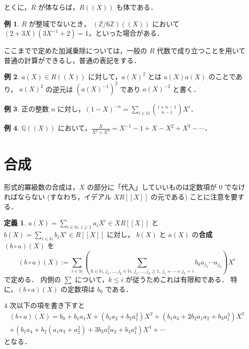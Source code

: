 \documentclass{jsarticle}
\newcommand{\N}{\mathbb{N}}
\newcommand{\Q}{\mathbb{Q}}
\newcommand{\Z}{\mathbb{Z}}
\theoremstyle{definition}
\newtheorem*{Dfn}{定義}
\newtheorem*{Exm}{例}
\newenvironment{dfn}{\vspace{1ex}\begin{screen}\begin{Dfn}}{\end{Dfn}\end{screen}\vspace{1ex}}
\newenvironment{exm}{\begin{leftbar}\begin{Exm}}{\end{Exm}\end{leftbar}}
\begin{document}
とくに，$R$ が体ならば，$R((X))$ も体である．

\begin{exm}
  $R$ が整域でないとき，
  $(\Z/6\Z)((X))$ において $(2 + 3X) (3X^{-1} + 2) = 1$，といった場合がある．
\end{exm}

ここまでで定めた加減乗除については，一般の $R$ 代数で成り立つことを用いて普通の計算ができるし，普通の表記をする．

\begin{exm}
  $a(X) \in R((X))$ に対して，$a(X)^2$ とは $a(X) a(X)$ のことであり，
  $a(X)^2$ の逆元は $(a(X)^{-1})^2$ であり $a(X)^{-2}$ と書く．
\end{exm}

\begin{exm}
  正の整数 $n$ に対し，$(1 - X)^{-n} = \sum_{i\in\N} \binom{i+n-1}{n-1} X^i$．
\end{exm}

\begin{exm}
  $\Q((X))$ において，$\frac{X}{X^2 + X^3} = X^{-1} - 1 + X - X^2 + X^3 - \cdots$．
\end{exm}


\section{合成}
形式的冪級数の合成は，$X$ の部分に「代入」していいものは定数項が $0$ でなければならない (すなわち，イデアル $X R[[X]]$ の元である) ことに注意を要する．

\begin{dfn}
  $a(X) = \sum_{i\in\N,\,i\ge 1} a_i X^i \in X R[[X]]$ と
  $b(X) = \sum_{i\in\N} b_i X^i \in R[[X]]$ に対し，
  $b(X)$ と $a(X)$ の\textbf{合成} $(b \circ a)(X)$ を
  \[
    (b \circ a)(X) := \sum_{i\in\N} \left(\sum_{k\in\N,\, j_1,\ldots,j_k\in\N,\, j_1,\ldots,j_k\ge 1,\, j_1+\cdots+j_k=i} b_k a_{j_1} \cdots a_{j_k} \right) X^i
  \]
  で定める．
  内側の $\sum$ について，$k \le i$ が従うためこれは有限和である．
  特に，$(b \circ a)(X)$ の定数項は $b_0$ である．
\end{dfn}

$4$ 次以下の項を書き下すと
\begin{align*}
  (b \circ a)(X)
  = b_0
  + b_1 a_1 X
  + (b_1 a_2 + b_2 a_1^2) X^2
  + (b_1 a_3 + 2 b_2 a_1 a_2 + b_3 a_1^3) X^3 \\
  + (b_1 a_4 + b_2 (a_1 a_3 + a_2^2) + 3 b_3 a_1^2 a_2 + b_4 a_1^4) X^4
  + \cdots
\end{align*}
となる．
\end{document}
